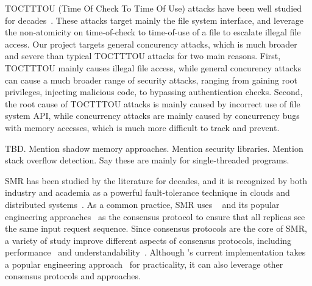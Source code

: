  TOCTTTOU (Time Of Check To Time Of Use) 
attacks have been well studied for 
decades~\cite{bishop:tocttou,toctou:fast08,toctou:fast05,toctou:usec03}. These 
attacks target mainly the file system interface, and leverage the non-atomicity 
on time-of-check to time-of-use of a file to escalate illegal file access. Our 
\xxx project targets general concurency attacks, which is much broader and 
severe than typical TOCTTTOU attacks for two main reasons. First, TOCTTTOU 
mainly causes illegal file access, while general concurency attacks can cause a 
much broader range of security attacks, ranging from gaining root privileges, 
injecting malicious code, to bypassing authentication checks. Second, the root 
cause of TOCTTTOU attacks is mainly caused by incorrect use of file system API, 
while concurrency attacks are mainly caused by concurrency bugs with memory 
accesses, which is much more difficult to track and prevent.

 TBD.
Mention shadow memory approaches.
Mention security libraries.
Mention stack overflow detection.
Say these are mainly for single-threaded programs.

  SMR has been studied by the literature 
for decades, and it is recognized by both industry and academia as a powerful 
fault-tolerance technique in clouds and distributed 
systems~\cite{lamportclock,smr:tutorial}. As a common practice, SMR uses 
\paxos~\cite{paxos,paxos:simple,paxos:complex} and its popular engineering 
approaches~\cite{paxos:live,paxos:practical} as the consensus protocol to 
ensure that all replicas see the same input request sequence. Since consensus 
protocols are the core of SMR, a variety of study improve different aspects of 
consensus protocols, including performance~\cite{epaxos:sosp13,paxos:fast} and 
understandability~\cite{raft:usenix14}. Although \xxx's current implementation 
takes a popular engineering approach~\cite{paxos:practical} for practicality, 
it can also leverage other consensus protocols and approaches.

